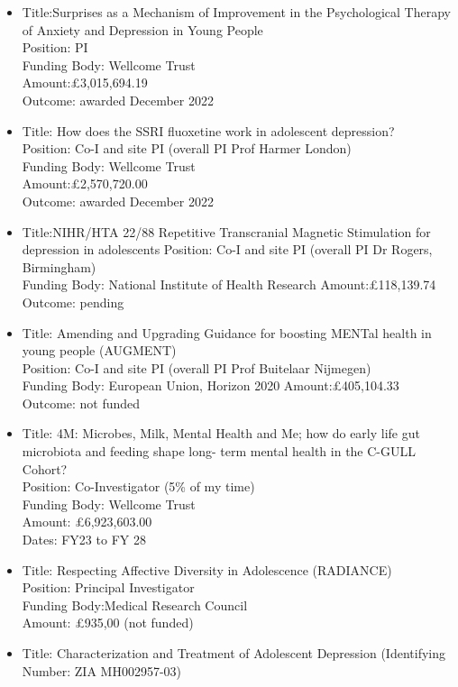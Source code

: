 \documentclass[
]{article}
\begin{document}
\begin{itemize}
\item
  Title:Surprises as a Mechanism of Improvement in the Psychological
  Therapy of Anxiety and Depression in Young People\\
  Position: PI\\
  Funding Body: Wellcome Trust\\
  Amount:£3,015,694.19\\
  Outcome: awarded December 2022
\item
  Title: How does the SSRI fluoxetine work in adolescent depression?\\
  Position: Co-I and site PI (overall PI Prof Harmer London)\\
  Funding Body: Wellcome Trust\\
  Amount:£2,570,720.00\\
  Outcome: awarded December 2022
\item
  Title:NIHR/HTA 22/88 Repetitive Transcranial Magnetic Stimulation for
  depression in adolescents Position: Co-I and site PI (overall PI Dr
  Rogers, Birmingham)\\
  Funding Body: National Institute of Health Research Amount:£118,139.74
  Outcome: pending
\item
  Title: Amending and Upgrading Guidance for boosting MENTal health in
  young people (AUGMENT)\\
  Position: Co-I and site PI (overall PI Prof Buitelaar Nijmegen)\\
  Funding Body: European Union, Horizon 2020 Amount:£405,104.33 Outcome:
  not funded
\item
  Title: 4M: Microbes, Milk, Mental Health and Me; how do early life gut
  microbiota and feeding shape long- term mental health in the C-GULL
  Cohort?\\
  Position: Co-Investigator (5\% of my time)\\
  Funding Body: Wellcome Trust\\
  Amount: £6,923,603.00\\
  Dates: FY23 to FY 28
\item
  Title: Respecting Affective Diversity in Adolescence (RADIANCE)\\
  Position: Principal Investigator\\
  Funding Body:Medical Research Council\\
  Amount: £935,00 (not funded)
\item
  Title: Characterization and Treatment of Adolescent Depression
  (Identifying Number: ZIA MH002957-03)\\

\end{itemize}
\end{document}
